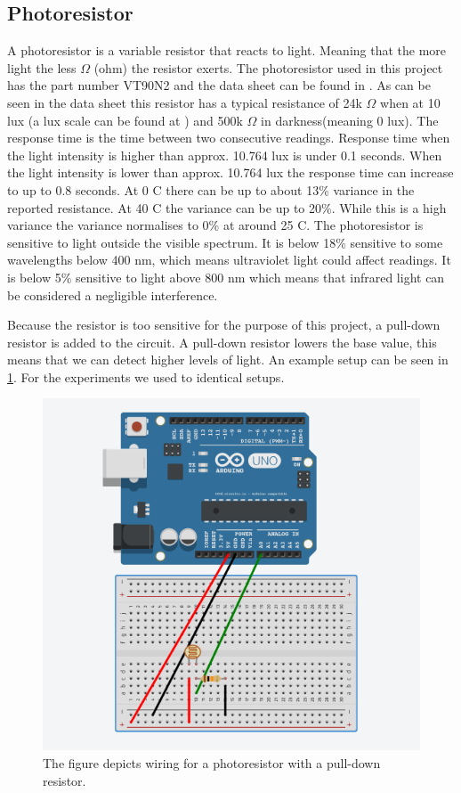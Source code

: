 \subsection{Photoresistor}\label{sub:photoresistor}
A photoresistor is a variable resistor that reacts to light. Meaning that the more light the less $\Omega$ (ohm) the resistor exerts. The photoresistor used in this project has the part number VT90N2 and the data sheet can be found in \cite{photoresistor_sheet}. As can be seen in the data sheet this resistor has a typical resistance of 24k $\Omega$ when at 10 lux (a lux scale can be found at \cite{lux_scale}) and 500k $\Omega$ in darkness(meaning 0 lux). The response time is the time between two consecutive readings. Response time when the light intensity is higher than approx. 10.764 lux is under 0.1 seconds. When the light intensity is lower than approx. 10.764 lux the response time can increase to up to 0.8 seconds. At 0 \degree C there can be up to about 13\% variance in the reported resistance. At 40 \degree C the variance can be up to 20\%. While this is a high variance the variance normalises to 0\% at around 25 \degree C. The photoresistor is sensitive to light outside the visible spectrum. It is below 18\% sensitive to some wavelengths below 400 nm, which means ultraviolet light could affect readings. It is below 5\% sensitive to light above 800 nm which means that infrared light can be considered a negligible interference.

Because the resistor is too sensitive for the purpose of this project, a pull-down resistor is added to the circuit\cite{pulldown_resistor}. A pull-down resistor lowers the base value, this means that we can detect higher levels of light. An example setup can be seen in \cref{fig:arduino_photoresistor_wiring}. For the experiments we used to identical setups.

\begin{figure}[htbp]
  \centering
  \includegraphics[width=\textwidth]{Implementation/hardware/PhotoSensorTests/Images/photoresistor_setup.png}
  \caption{The figure depicts wiring for a photoresistor with a pull-down resistor.}\label{fig:arduino_photoresistor_wiring}
\end{figure}

